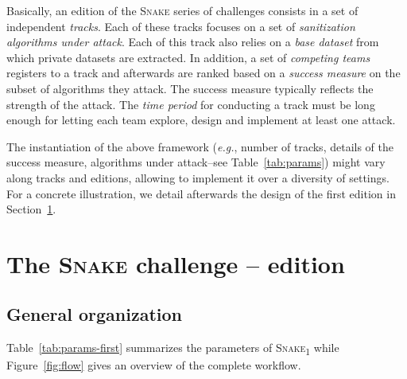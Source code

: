 \documentclass{article}
\newcommand{\name}{\textsc{Snake}\xspace}
\begin{document}
Basically, an edition of the \name series of challenges consists in a set of independent \emph{tracks}.
Each of these tracks focuses on a set of \emph{sanitization algorithms under attack}.
Each of this track also relies on a \emph{base dataset} from which private datasets are extracted.
In addition, a set of \emph{competing teams} registers to a track and afterwards are ranked based on a \emph{success measure} on the subset of algorithms they attack.
The success measure typically reflects the strength of the attack.
The \emph{time period} for conducting a track must be long enough for letting each team explore, design and implement at least one attack.

The instantiation of the above framework (\emph{e.g.}, number of tracks, details of the success measure, algorithms under attack--see Table~\ref{tab:params}) might vary along tracks and editions, allowing to implement it over a diversity of settings.
For a concrete illustration, we detail afterwards the design of the first edition in Section~\ref{sec:firsted}.

\section{The \name challenge -- \texorpdfstring{}{First} edition}
\label{sec:firsted}

\subsection{General organization}

Table~\ref{tab:params-first} summarizes the parameters of \name\textsubscript{1} while Figure~\ref{fig:flow} gives an overview of the complete workflow.
\end{document}

